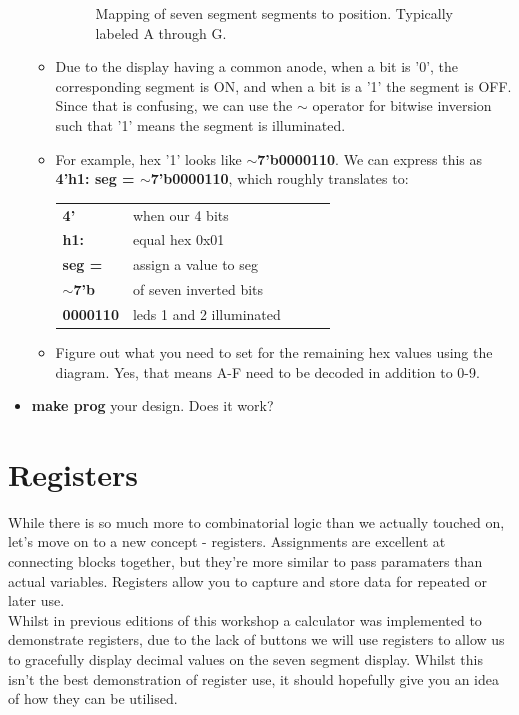 \documentclass[12pt,a4paper]{article}
\begin{document}
\begin{itemize}
\begin{itemize}
\begin{figure}[H]
\begin{center}
			\caption{Mapping of seven segment segments to position. Typically labeled A through G.}
		\end{center} 
	\end{figure}
		\item Due to the display having a common anode, when a bit is '0', the corresponding segment is ON, and when a bit is a '1' the segment is OFF. Since that is confusing, we can use the $\sim$ operator for bitwise inversion such that '1' means the segment is illuminated. 
		\item For example, hex '1' looks like \textbf{$\sim$7'b0000110}. We can express this as \\ \textbf{4'h1: seg = $\sim$7'b0000110}, which roughly translates to:
		\begin{table}[H]
			\centering
			\begin{tabular}{lllll}
				\textbf{4'}        & when our 4 bits          &  &  &  \\
				\textbf{h1:}       & equal hex 0x01           &  &  &  \\
				\textbf{seg =}   & assign a value to seg    &  &  &  \\
				\textbf{$\sim$7'b} & of seven inverted bits   &  &  &  \\
				\textbf{0000110}   & leds 1 and 2 illuminated &  &  & 
			\end{tabular}
		\end{table}
		\item Figure out what you need to set for the remaining hex values using the diagram. Yes, that means A-F need to be decoded in addition to 0-9. 
	\end{itemize}
	\item \textbf{make prog} your design. Does it work?
\end{itemize}
\section{Registers}
While there is so much more to combinatorial logic than we actually touched on, let's move on to a new concept - registers. Assignments are excellent at connecting blocks together, but they're more similar to pass paramaters than actual variables. Registers allow you to capture and store data for repeated or later use. \\

\noindent
Whilst in previous editions of this workshop a calculator was implemented to demonstrate registers, due to the lack of buttons we will use registers to allow us to gracefully display decimal values on the seven segment display. Whilst this isn't the best demonstration of register use, it should hopefully give you an idea of how they can be utilised.
\end{document}
